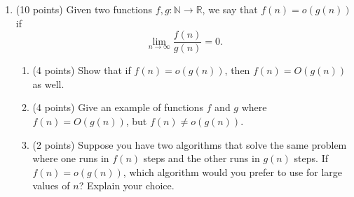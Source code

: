 \documentclass[11pt]{article}
\theoremstyle{plain}
\newcommand{\N}{\mathbb{N}}
\newcommand{\R}{\mathbb{R}}
\begin{document}
\begin{enumerate}
\begin{enumerate}
        \vfill

    \end{enumerate}

    \newpage

    \item (10 points)
    Given two functions $f,g: \N\to \R$, we say that $f(n) = o(g(n))$ if
    \[
        \lim_{n\to \infty}\frac{f(n)}{g(n)} = 0.
    \]
    \begin{enumerate}
        \item (4 points)
        Show that if $f(n) = o(g(n))$, then $f(n) = O(g(n))$ as well.

        \vfill

        \item (4 points)
        Give an example of functions $f$ and $g$ where $f(n) = O(g(n))$, but $f(n) \neq o(g(n))$.

        \vfill

        \item (2 points)
        Suppose you have two algorithms that solve the same problem where one runs in $f(n)$ steps and the other runs in $g(n)$ steps.
        If $f(n) = o(g(n))$, which algorithm would you prefer to use for large values of $n$?
        Explain your choice.
        \vfill

    \end{enumerate}

\end{enumerate}
\end{document}
